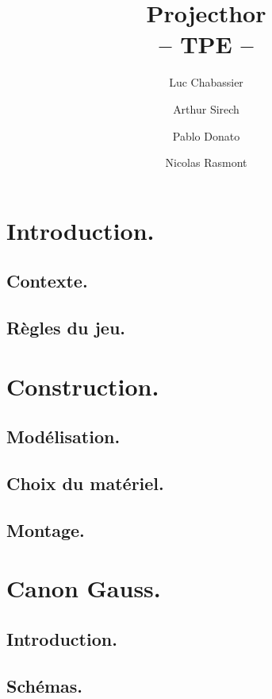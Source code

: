 \documentclass{report}
\title{Projecthor\\-- TPE --}
\author{Luc Chabassier \and Arthur Sirech \and Pablo Donato \and Nicolas Rasmont}
\begin{document}
\maketitle

\tableofcontents

\part{Introduction.}
\chapter{Contexte.} \label{intro}
% 

\chapter{Règles du jeu.} \label{regles}


\part{Construction.}
\chapter{Modélisation.} \label{moter}
% 

\chapter{Choix du matériel.} \label{mater} %
% 
% 

\chapter{Montage.} \label{mont}
% 

\part{Canon Gauss.}
\chapter{Introduction.} \label{gauss}
% 

\chapter{Schémas.} \label{schem}
% 
\end{document}
